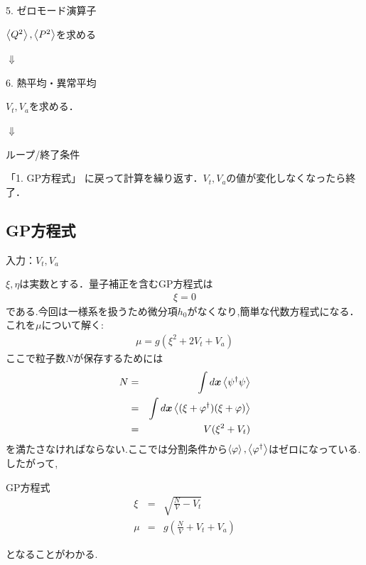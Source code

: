 \documentclass[10.5pt,a4paper]{jreport}
\begin{document}
\begin{itembox}[c]{5. ゼロモード演算子}
  \begin{center}
    $\ev{Q^2}, \ev{P^2}$を求める
  \end{center}
\end{itembox}

\begin{center}
  $\Downarrow$
\end{center}

\begin{itembox}[c]{6. 熱平均・異常平均}
  \begin{center}
    $V_t, V_a$を求める．
  \end{center}
\end{itembox}

\begin{center}
  $\Downarrow$
\end{center}

\begin{itembox}[c]{ループ/終了条件}
  \begin{center}
    「1. GP方程式」 に戻って計算を繰り返す．$V_t, V_a$の値が変化しなくなったら終了．
  \end{center}
\end{itembox}

\subsection{GP方程式}
入力：$V_t,V_a$

$\xi,\eta$は実数とする．量子補正を含むGP方程式は
\begin{eqnarray}
  [-\mu + g\xi^2 + g(2V_t + V_a)]\xi = 0
\end{eqnarray}  
である.今回は一様系を扱うため微分項$h_0$がなくなり,簡単な代数方程式になる．これを$\mu$について解く:
\begin{eqnarray}
  \mu = g(\xi^2 + 2V_t + V_a)
\end{eqnarray}
ここで粒子数$N$が保存するためには
\begin{eqnarray}
  \nonumber  N &=& \int d\bm{x}\ev{\psi^\dagger\psi}\\
  \nonumber  &=& \int d\bm{x}\ev{(\xi + \varphi^\dagger)(\xi + \varphi)}\\
  &=& V(\xi^2 + V_t)
\end{eqnarray}
を満たさなければならない.ここでは分割条件から$\ev{\varphi},\ev{\varphi^\dagger}$はゼロになっている.したがって,
\begin{itembox}[c]{GP方程式}
\begin{eqnarray}
  \xi &=& \sqrt{\frac{N}{V} - V_t}\\
  \mu &=& g(\frac{N}{V} + V_t + V_a)
\end{eqnarray}
\end{itembox}
となることがわかる.
\end{document}

